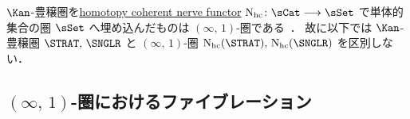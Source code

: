 \documentclass[TQFT_main]{subfiles}
\begin{document}
\begin{marker}
    $\Kan$-豊穣圏を\hyperref[def:nerve-hc]{homotopy coherent nerve functor} $\mathrm{N}_{\text{hc}} \colon \sCat \lto \sSet$ で単体的集合の圏 $\sSet$ へ埋め込んだものは $(\infty,\, 1)$-圏である~\cite[Proposition 1.1.5.10.]{lurie2008higher}．
    故に以下では $\Kan$-豊穣圏 $\STRAT,\, \SNGLR$ と $(\infty,\, 1)$-圏 $\mathrm{N}_{\text{hc}} (\STRAT),\, \mathrm{N}_{\text{hc}} (\SNGLR)$ を区別しない．
\end{marker}

\subsection{$(\infty,\, 1)$-圏におけるファイブレーション}
\end{document}
